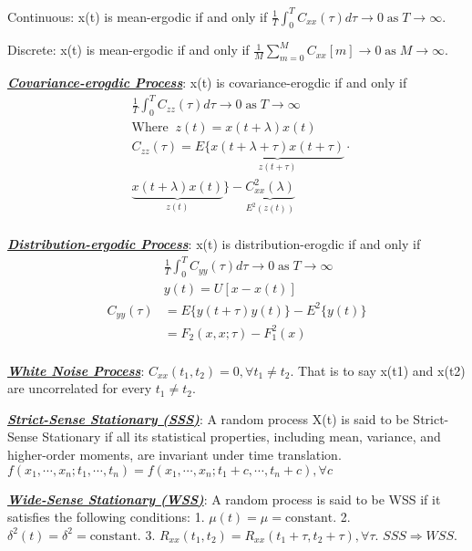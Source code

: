\documentclass[12pt]{article}
\newcommand{\bulletPoint}[1]{\ul{\textit{\textbf{#1}}}}
\begin{document}
\begin{multicols*}{4}
Continuous: x(t) is mean-ergodic if and only if $\frac{1}{T}\int^T_0C_{xx}(\tau)d\tau \rightarrow 0 \; \text{as} \; T \rightarrow \infty$.

Discrete: x(t) is mean-ergodic if and only if $\frac{1}{M}\sum^M_{m=0}C_{xx}[m]\rightarrow 0 \; \text{as} \; M \rightarrow \infty$.


\bulletPoint{Covariance-erogdic Process}: x(t) is covariance-erogdic if and only if
\useshortskip \begin{equation*}
    \begin{split}
        & \frac{1}{T} \int^T_0C_{zz}(\tau)d\tau \rightarrow 0 \; \text{as} \; T\rightarrow\infty \\[-3pt]
        & \text{Where} \;\; z(t) = x(t+\lambda)x(t)\\[-3pt]
        & C_{zz}(\tau) = E\{\underbrace{x(t+\lambda+\tau)x(t+\tau)}_{z(t+\tau)} \cdot\\[-5pt]
        & \underbrace{x(t+\lambda)x(t)}_{z(t)}\} - \underbrace{C^2_{xx}(\lambda)}_{E^2(z(t))}\\[-7pt]
    \end{split}
\end{equation*}


\bulletPoint{Distribution-ergodic Process}: x(t) is distribution-erogdic if and only if
\useshortskip \begin{equation*}
    \begin{split}
        & \frac{1}{T}\int^T_0C_{yy}(\tau)d\tau\rightarrow0 \; \text{as} \; T\rightarrow\infty \\[-3pt]
        & y(t) = U[x-x(t)]\\[-5pt]
        C_{yy}(\tau) & = E\{y(t+\tau)y(t)\} - E^2\{y(t)\} \\[-3pt]
        & = F_2(x,x;\tau)-F^2_1(x)\\[-7pt]
    \end{split}
\end{equation*}


\bulletPoint{White Noise Process}: $C_{xx}(t_1,t_2) = 0, \forall t_1 \neq t_2$. That is to say x(t1) and x(t2) are uncorrelated for every $t_1 \neq t_2$.


\bulletPoint{Strict-Sense Stationary (SSS)}: A random process X(t) is said to be Strict-Sense Stationary if all its statistical properties, including mean, variance, and higher-order moments, are invariant under time translation. $f(x_1, \cdots, x_n; t_1, \cdots, t_n) = f(x_1, \cdots, x_n; t_1+c, \cdots, t_n+c), \forall c$


\bulletPoint{Wide-Sense Stationary (WSS)}: A random process is said to be WSS if it satisfies the following conditions: 1. $\mu(t) = \mu = \text{constant}$. 2. $\delta^2(t) = \delta^2 = \text{constant}$. 3. $R_{xx}(t_1, t_2) = R_{xx}(t_1 + \tau, t_2+\tau), \forall \tau$. $SSS \Longrightarrow WSS$.



\end{multicols*}
\end{document}
